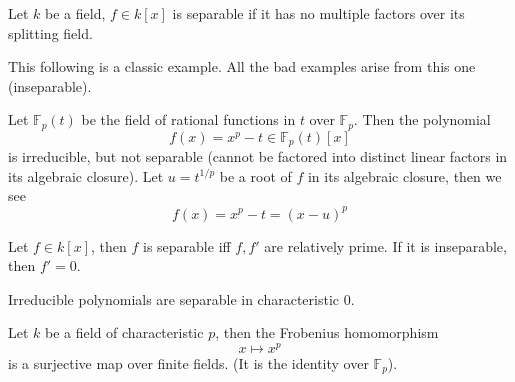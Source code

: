 \documentclass[openany]{book}
\newcommand{\F}{\mathbb{F}}
\begin{document}
\begin{defn}[separable]
    Let $k$ be a field, $f\in k[x]$ is separable if it has no multiple factors over its splitting field.
\end{defn}

\begin{warn}
    This following is a classic example. All the bad examples arise from this one (inseparable).
\end{warn}

\begin{example}
    Let $\F_p(t)$ be the field of rational functions in $t$ over $\F_p$. Then the polynomial 
    \begin{equation*}
        f(x)=x^p-t\in \F_p(t)[x]
    \end{equation*}
    is irreducible, but not separable (cannot be factored into distinct linear factors in its algebraic closure). Let $u=t^{1/p}$ be a root of $f$ in its algebraic closure, then we see 
    \begin{equation*}
        f(x)=x^p-t=(x-u)^p
    \end{equation*}
\end{example}


\begin{prop}
    Let $f\in k[x]$, then $f$ is separable iff $f, f'$ are relatively prime. If it is inseparable, then $f'=0$.
\end{prop}

\begin{prop}
    Irreducible polynomials are separable in characteristic 0. 
    
\end{prop}

\begin{prop}
    Let $k$ be a field of characteristic $p$, then the Frobenius homomorphism 
    \begin{equation*}
        x\mapsto x^p
    \end{equation*}
    is a surjective map over finite fields. (It is the identity over $\F_p$).
\end{prop}




\end{document}
